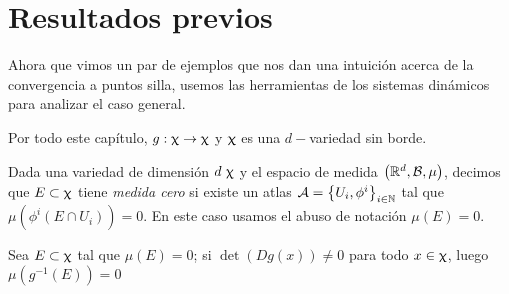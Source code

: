 \section{Resultados previos}


Ahora que vimos un par de ejemplos que nos dan una intuici\'on acerca de la convergencia a puntos silla, usemos las herramientas de los sistemas din\'amicos para analizar el caso general.

Por todo este cap\'itulo, $g: \upchi \rightarrow \upchi$ y $\upchi$ es una $d-$variedad sin borde.

\begin{definition}
	Dada una variedad de dimensi\'on $d \ \mani$ y el espacio de medida $\left({\mathbb{R}}^d, \mathcal{B}, \mu\right)$, decimos que $E \subset \upchi$ tiene \textit{medida cero} si existe un atlas $\mathcal{A} = \left\lbrace U_i, \phi^i\right\rbrace_{i \in {\mathbb{N}}}$ tal que $\mu \left(\phi^i \left(E \cap U_i \right) \right) = 0$. En este caso usamos el abuso de notaci\'on $\mu(E) = 0$.
\end{definition}

\begin{lemma}
	\label{Difeomorfismos locales preservan medida cero}
	Sea $E \subset \upchi$ tal que $\mu(E) = 0$; si $\det \left(Dg(x)\right) \neq 0$ para todo $x \in \upchi$, luego $\mu\left(g^{-1}(E)\right) = 0$
\end{lemma}

